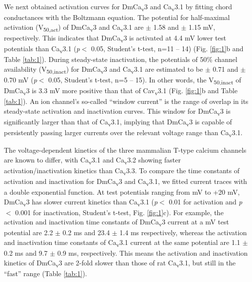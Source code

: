We next obtained activation curves for DmCa\textsubscript{v}3 and Ca\textsubscript{v}3.1 by fitting chord conductances with the Boltzmann equation. The potential for half-maximal activation (V\textsubscript{50,act}) of DmCa\textsubscript{v}3 and Ca\textsubscript{v}3.1 are  $\pm$ 1.58 and  $\pm$ 1.15 mV, respectively. This indicates that DmCa\textsubscript{v}3 is activated at 4.4 mV lower test potentials than Ca\textsubscript{v}3.1 (\emph{p}$<$ 0.05, Student's t-test, n=11 -- 14) (Fig. \ref{fig:1}b and Table \ref{tab:1}).
During steady-state inactivation, the potentials of 50\% channel availability (V\textsubscript{50,inact}) for DmCa\textsubscript{v}3 and Ca\textsubscript{v}3.1 are estimated to be  $\pm$ 0.71 and  $\pm$ 0.70 mV (\emph{p}$<$ 0.05, Student's t-test, n=5 -- 15). In other words, the V\textsubscript{50,inact} of DmCa\textsubscript{v}3 is 3.3 mV more positive than that of Cav\textsubscript{v}3.1 (Fig. \ref{fig:1}b and Table \ref{tab:1}).
An ion channel's so-called ``window current'' is the range of overlap in its steady-state activation and inactivation curves. This window for DmCa\textsubscript{v}3 is significantly larger than that of Ca\textsubscript{v}3.1, implying that DmCa\textsubscript{v}3 is capable of persistently passing larger currents over the relevant voltage range than Ca\textsubscript{v}3.1.

The voltage-dependent kinetics of the three mammalian T-type calcium channels are known to differ, with Ca\textsubscript{v}3.1 and Ca\textsubscript{v}3.2 showing faster activation/inactivation kinetics than Ca\textsubscript{v}3.3\cite{klockner:1999aa}.
To compare the time constants of activation and inactivation for DmCa\textsubscript{v}3 and Ca\textsubscript{v}3.1, we fitted current traces with a double exponential function.
At test potentials ranging from  mV to +20 mV,  DmCa\textsubscript{v}3 has slower current kinetics than Ca\textsubscript{v}3.1 (\emph{p}$<$ 0.01 for activation and \emph{p}$<$ 0.001 for inactivation, Student's t-test, Fig. \ref{fig:1}c).
For example, the activation and inactivation time constants of DmCa\textsubscript{v}3 current at a  mV test potential are 2.2 $\pm$ 0.2 ms and 23.4 $\pm$ 1.4 ms respectively, whereas the activation and inactivation time constants of Ca\textsubscript{v}3.1 current at the same potential are 1.1 $\pm$ 0.2 ms and 9.7 $\pm$ 0.9 ms, respectively. This means the activation and inactivation kinetics of DmCa\textsubscript{v}3 are 2-fold slower than those of rat Ca\textsubscript{v}3.1, but still in the ``fast'' range (Table \ref{tab:1}).

